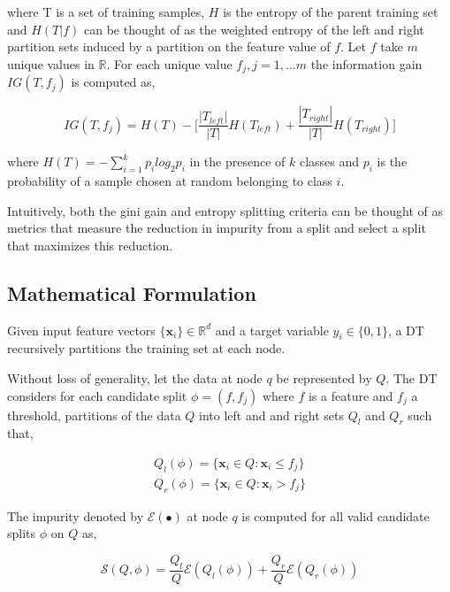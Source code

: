 \documentclass[final,3p,times,twocolumn]{elsarticle}
\begin{document}
where T is a set of training samples, $H$ is the entropy of the parent training set and $H(T|f)$ can be thought of as the weighted entropy of the left and right partition sets induced by a partition on the feature value of $f$. Let $f$ take $m$ unique values in $\mathbb{R}.$ For each unique value $f_{j}, j = 1,...m$ the information gain $IG(T,f_{j})$ is computed as,

\begin{equation}
IG(T,f_{j}) = H(T) - \Bigg[ \dfrac{|T_{left}|}{|T|} H(T_{left}) + \dfrac{|T_{right}|}{|T|} H(T_{right}) \Bigg]
\end{equation} 

where $H(T) = -\sum_{i=1}^{k}p_{i}log_{2}p_{i}$ in the presence of $k$ classes and $p_{i}$ is the probability of a sample chosen at random belonging to class $i$. 

Intuitively, both the gini gain and entropy splitting criteria can be thought of as metrics that measure the reduction in impurity from a split and select a split that maximizes this reduction. 

\subsection{Mathematical Formulation}

Given input feature vectors $\{\textbf{x}_{i}\} \in \mathbb{R}^d$ and a target variable $y_{i} \in \{0,1\}$, a DT recursively partitions the training set at each node. 

Without loss of generality, let the data at node $q$ be represented by $Q$. The DT considers for each candidate split $\phi = (f,f_{j})$ where $f$ is a feature and $f_{j}$ a threshold, partitions of the data $Q$ into left and and right sets $Q_{l}$ and $Q_{r}$ such that,

\begin{gather*}
Q_{l}(\phi) = \{\textbf{x}_{i} \in Q : \textbf{x}_{i} \leqslant f_{j}\} \\
Q_{r}(\phi) = \{\textbf{x}_{i} \in Q : \textbf{x}_{i}> f_{j}\}
\end{gather*}

The impurity denoted by $\mathcal{E}(\bullet)$ at node $q$ is computed for all valid candidate splits $\phi$ on $Q$ as, 

\begin{equation}
\mathcal{S}(Q,\phi) = \dfrac{Q_{l}}{Q}\mathcal{E}(Q_{l}(\phi)) + \dfrac{Q_{r}}{Q}\mathcal{E}(Q_{r}(\phi)) 
\end{equation}
\end{document}
